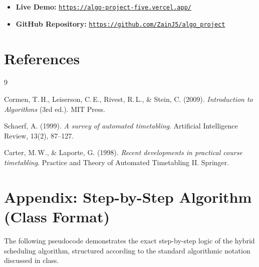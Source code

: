 \documentclass[12pt, a4paper]{article}
\begin{document}
\begin{itemize}[noitemsep, topsep=4pt]
    \item \textbf{Live Demo:}
          \href{https://algo-project-five.vercel.app/}{\texttt{https://algo-project-five.vercel.app/}}

    \item \textbf{GitHub Repository:}
          \href{https://github.com/ZainJ5/algo\_project}{\texttt{https://github.com/ZainJ5/algo\_project}}
\end{itemize}

\newpage
\section{References}

\begin{thebibliography}{9}

Cormen, T.\,H., Leiserson, C.\,E., Rivest, R.\,L., \& Stein, C. (2009).
\textit{Introduction to Algorithms} (3rd ed.). MIT Press.

Schaerf, A. (1999).
\textit{A survey of automated timetabling}.
Artificial Intelligence Review, 13(2), 87--127.

Carter, M.\,W., \& Laporte, G. (1998).
\textit{Recent developments in practical course timetabling}.
Practice and Theory of Automated Timetabling II. Springer.

\end{thebibliography}

\newpage

\appendix
\section{Appendix: Step-by-Step Algorithm (Class Format)}

The following pseudocode demonstrates the exact step-by-step logic of the hybrid
scheduling algorithm, structured according to the standard algorithmic notation
discussed in class.
\end{document}
